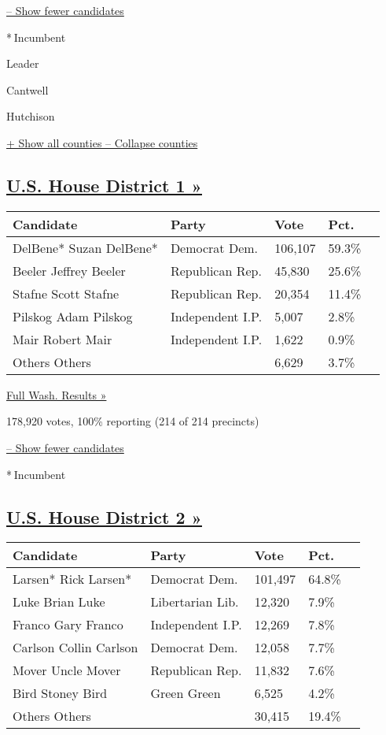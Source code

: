 \protect\hyperlink{}{-- Show fewer candidates}

* Incumbent

Leader

 Cantwell

 Hutchison

\protect\hyperlink{}{+ Show all counties -- Collapse counties}

\hypertarget{us-house-district-1-}{%
\subsection{\texorpdfstring{\href{https://www.nytimes3xbfgragh.onion/elections/results/washington-house-district-1-primary-election}{U.S.
House District 1
»}}{U.S. House District 1 »}}\label{us-house-district-1-}}

\begin{longtable}[]{@{}lllll@{}}
\toprule
Candidate & Party & Vote & Pct. &\tabularnewline
\midrule
\endhead
 DelBene* Suzan DelBene* & Democrat Dem. & 106,107 & 59.3\%
&\tabularnewline
 Beeler Jeffrey Beeler & Republican Rep. & 45,830 & 25.6\%
&\tabularnewline
 Stafne Scott Stafne & Republican Rep. & 20,354 & 11.4\%
&\tabularnewline
 Pilskog Adam Pilskog & Independent I.P. & 5,007 & 2.8\%
&\tabularnewline
 Mair Robert Mair & Independent I.P. & 1,622 & 0.9\% &\tabularnewline
 Others Others & & 6,629 & 3.7\% &\tabularnewline
\bottomrule
\end{longtable}

\href{https://www.nytimes3xbfgragh.onion/elections/results/washington}{Full
Wash. Results »}

178,920 votes, 100\% reporting (214 of 214 precincts)

\protect\hyperlink{}{-- Show fewer candidates}

* Incumbent

\hypertarget{us-house-district-2-}{%
\subsection{\texorpdfstring{\href{https://www.nytimes3xbfgragh.onion/elections/results/washington-house-district-2-primary-election}{U.S.
House District 2
»}}{U.S. House District 2 »}}\label{us-house-district-2-}}

\begin{longtable}[]{@{}lllll@{}}
\toprule
Candidate & Party & Vote & Pct. &\tabularnewline
\midrule
\endhead
 Larsen* Rick Larsen* & Democrat Dem. & 101,497 & 64.8\%
&\tabularnewline
 Luke Brian Luke & Libertarian Lib. & 12,320 & 7.9\% &\tabularnewline
 Franco Gary Franco & Independent I.P. & 12,269 & 7.8\% &\tabularnewline
 Carlson Collin Carlson & Democrat Dem. & 12,058 & 7.7\%
&\tabularnewline
 Mover Uncle Mover & Republican Rep. & 11,832 & 7.6\% &\tabularnewline
 Bird Stoney Bird & Green Green & 6,525 & 4.2\% &\tabularnewline
 Others Others & & 30,415 & 19.4\% &\tabularnewline
\bottomrule
\end{longtable}

